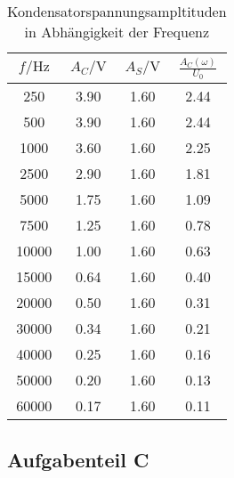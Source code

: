 \begin{table}
	\centering
	\caption{Kondensatorspannungsampltituden in Abhängigkeit der Frequenz}
	\label{tab:Amplitude}
	\begin{tabular}{c c c c}
	  \toprule
	  $f/\unit{\hertz}$ & $A_C/\unit{\volt}$ & $A_S/\unit{\volt}$ & $\frac{A_C(\omega)}{U_0}$ \\
	  \midrule      
	  250    &   3.90  &   1.60  & 2.44 \\      
	  500    &   3.90  &   1.60  & 2.44  \\    
	 1000    &   3.60  &   1.60  & 2.25   \\   
	 2500    &   2.90  &   1.60  & 1.81     \\ 
	 5000    &   1.75  &   1.60  & 1.09      \\
	 7500    &   1.25  &   1.60  & 0.78      \\
	 10000    &   1.00  &   1.60 & 0.63       \\
	 15000    &   0.64  &   1.60 & 0.40      \\
	 20000    &   0.50  &   1.60 & 0.31       \\
	 30000    &   0.34  &   1.60 & 0.21       \\
	 40000    &   0.25  &   1.60 & 0.16       \\
	 50000    &   0.20  &   1.60 & 0.13       \\
	 60000    &   0.17  &   1.60 & 0.11       \\
	  \bottomrule
	\end{tabular}
  \end{table}

\subsection{Aufgabenteil C}


